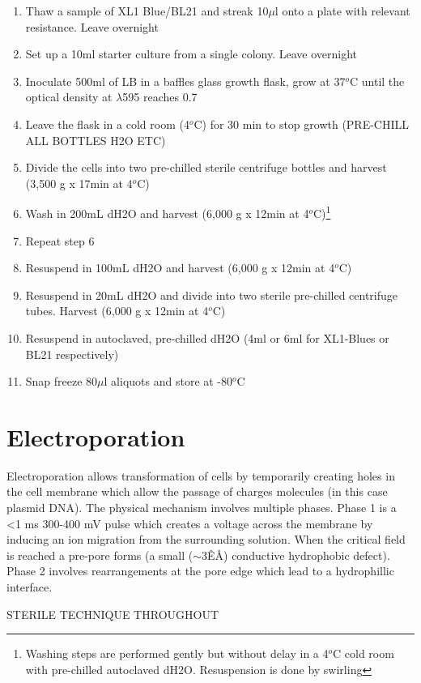 \documentclass{tufte-book} %
\begin{document}
\begin{enumerate}
\item Thaw a sample of XL1 Blue/BL21 and streak 10$\mu$l onto a plate with relevant resistance. Leave overnight
\item Set up a 10ml starter culture from a single colony. Leave overnight
\item Inoculate 500ml of LB in a baffles glass growth flask, grow at 37$^{o}$C until the optical density at $\lambda$595 reaches 0.7
\item Leave the flask in a cold room (4$^{o}$C) for 30 min to stop growth (PRE-CHILL ALL BOTTLES H2O ETC)
\item Divide the cells into two pre-chilled sterile centrifuge bottles and harvest (3,500 g x 17min at 4$^{o}$C)
\item Wash in 200mL dH2O and harvest (6,000 g x 12min at 4$^{o}$C)\footnote{Washing steps are performed gently but without delay in a 4$^{o}$C cold room with pre-chilled autoclaved dH2O. Resuspension is done by swirling}
\item Repeat step 6
\item Resuspend in 100mL dH2O and harvest (6,000 g x 12min at 4$^{o}$C)
\item Resuspend in 20mL dH2O and divide into two sterile pre-chilled centrifuge tubes. Harvest (6,000 g x 12min at 4$^{o}$C)
\item Resuspend in autoclaved, pre-chilled dH2O (4ml or 6ml for XL1-Blues or BL21 respectively)
\item Snap freeze 80$\mu$l aliquots and store at -80$^{o}$C
\end{enumerate}

\newpage
\section{Electroporation}

Electroporation allows transformation of cells by temporarily creating holes in the cell membrane which allow the passage of charges molecules (in this case plasmid DNA). The physical mechanism involves multiple phases. Phase 1 is a <1 ms 300-400 mV pulse which creates a voltage across the membrane by inducing an ion migration from the surrounding solution. When the critical field is reached a pre-pore forms (a small ($\sim$3Ê\AA) conductive hydrophobic defect).  Phase 2 involves rearrangements at the pore edge which lead to a hydrophillic interface.

STERILE TECHNIQUE THROUGHOUT
\end{document}
